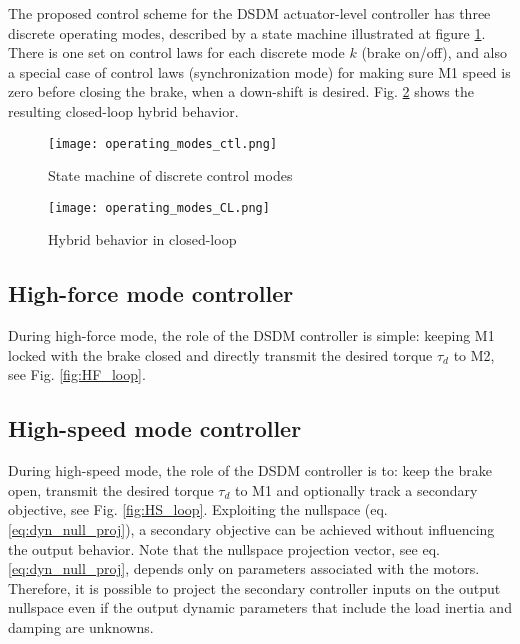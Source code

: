 The proposed control scheme for the DSDM actuator-level controller has three discrete operating modes, described by a state machine illustrated at figure \ref{fig:automaticflow}. There is one set on control laws for each discrete mode $k$ (brake on/off), and also a special case of control laws (synchronization mode) for making sure M1 speed is zero before closing the brake, when a down-shift is desired. Fig. \ref{fig:hybrid_closedloop} shows the resulting closed-loop hybrid behavior.

\begin{figure}[H]
	\centering
		\texttt{[image: operating\_modes\_ctl.png]}
	\caption{State machine of discrete control modes}
	\label{fig:automaticflow}
\end{figure}

\begin{figure}[H]
	\centering
		\texttt{[image: operating\_modes\_CL.png]}
	\caption{Hybrid behavior in closed-loop}
	\label{fig:hybrid_closedloop}
\end{figure}



\subsection{High-force mode controller}

During high-force mode, the role of the DSDM controller is simple: keeping M1 locked with the brake closed and directly transmit the desired torque $\tau_d$ to M2, see Fig. \ref{fig:HF_loop}. 




\subsection{High-speed mode controller}


During high-speed mode, the role of the DSDM controller is to: keep the brake open, transmit the desired torque $\tau_d$ to M1 and optionally track a secondary objective, see Fig. \ref{fig:HS_loop}. Exploiting the nullspace (eq. \eqref{eq:dyn_null_proj}), a secondary objective can be achieved without influencing the output behavior. Note that the nullspace projection vector, see eq.\eqref{eq:dyn_null_proj}, depends only on parameters associated with the motors. Therefore, it is possible to project the secondary controller inputs on the output nullspace even if the output dynamic parameters that include the load inertia and damping are unknowns. 

